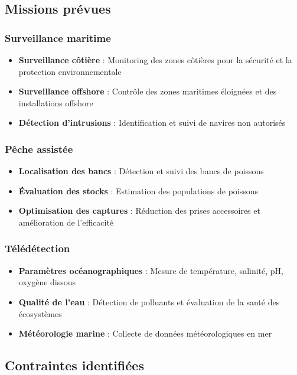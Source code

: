 {\subsection{Missions prévues}
\subsubsection{Surveillance maritime}
\begin{itemize}
    \item \textbf{Surveillance côtière} : Monitoring des zones côtières pour la sécurité et la protection environnementale
    \item \textbf{Surveillance offshore} : Contrôle des zones maritimes éloignées et des installations offshore
    \item \textbf{Détection d'intrusions} : Identification et suivi de navires non autorisés
\end{itemize}

\subsubsection{Pêche assistée}
\begin{itemize}
    \item \textbf{Localisation des bancs} : Détection et suivi des bancs de poissons
    \item \textbf{Évaluation des stocks} : Estimation des populations de poissons
    \item \textbf{Optimisation des captures} : Réduction des prises accessoires et amélioration de l'efficacité
\end{itemize}

\subsubsection{Télédétection}
\begin{itemize}
    \item \textbf{Paramètres océanographiques} : Mesure de température, salinité, pH, oxygène dissous
    \item \textbf{Qualité de l'eau} : Détection de polluants et évaluation de la santé des écosystèmes
    \item \textbf{Météorologie marine} : Collecte de données météorologiques en mer
\end{itemize}

\subsection{Contraintes identifiées}
}
